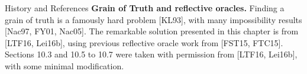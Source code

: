 \documentclass[aspectratio=169,10pt]{beamer}
\begin{document}
\begin{frame}[allowframebreaks]{History and References}
  \framebreak
  \textbf{Grain of Truth and reflective oracles.} Finding a grain of truth
  is a famously hard problem {\footnotesize[KL93]}, with many
  impossibility results {\footnotesize[Nac97, FY01, Nac05]}. The
  remarkable solution presented in this chapter is from
  {\footnotesize[LTF16, Lei16b]}, using previous reflective oracle work
  from {\footnotesize[FST15, FTC15]}. Sections 10.3 and 10.5 to 10.7 were
  taken with permission from {\footnotesize[LTF16, Lei16b]}, with some
  minimal modification.
\end{frame}
\end{document}
